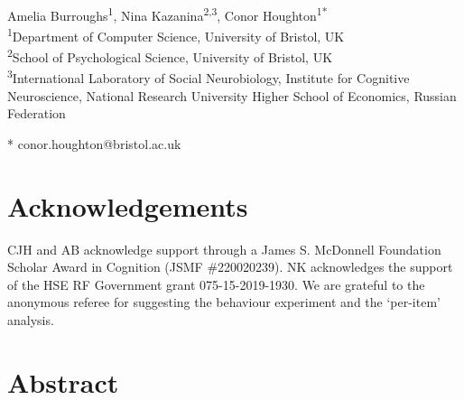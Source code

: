 \documentclass[10pt,letterpaper]{article}
\date{}
\begin{document}
\vspace*{0.2in}

\begin{flushleft}
{\Large
\textbf{} 
}
\newline
\\
Amelia Burroughs\textsuperscript{1},
Nina Kazanina\textsuperscript{2,3},
Conor Houghton\textsuperscript{1*}
\\
\bigskip
\textsuperscript{1}Department of Computer Science, University of
Bristol, UK\\ \textsuperscript{2}School of Psychological Science,
University of Bristol, UK\\ \textsuperscript{3}International
Laboratory of Social Neurobiology, Institute for Cognitive
Neuroscience, National Research University Higher School of Economics,
Russian Federation \\
\bigskip

* conor.houghton@bristol.ac.uk

\end{flushleft}


\section*{Acknowledgements}
CJH and AB acknowledge support through a James S. McDonnell Foundation
Scholar Award in Cognition (JSMF \#220020239). NK acknowledges the
support of the HSE RF Government grant 075-15-2019-1930. We are
grateful to the anonymous referee for suggesting the behaviour
experiment and the `per-item' analysis.

\section*{Abstract}
\end{document}

